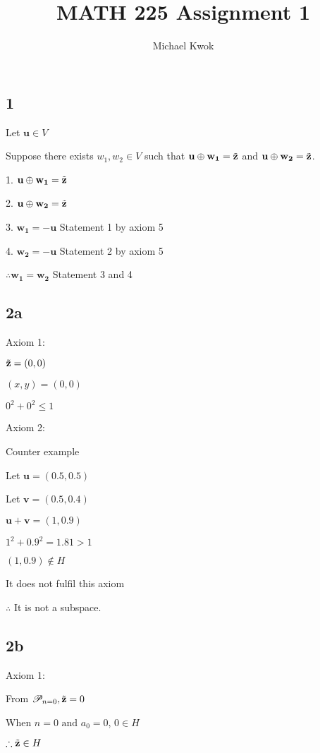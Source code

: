 \documentclass{article}
\title{MATH 225 Assignment 1}
\author{Michael Kwok}
\begin{document}
\maketitle
\subsection*{1}
Let $\mathbf{u} \in V$

Suppose there exists $w_1, w_2 \in V$ such that $\mathbf{u} \oplus \mathbf{w_1} = \Tilde{\mathbf{z}}$ and $\mathbf{u} \oplus \mathbf{w_2} = \Tilde{\mathbf{z}}$.

1. $\mathbf{u}\oplus \mathbf{w_1} = \Tilde{\mathbf{z}}$

2. $\mathbf{u}\oplus \mathbf{w_2} = \Tilde{\mathbf{z}}$

3. $\mathbf{w_1} = - \mathbf{u}$ Statement 1 by axiom 5

4. $\mathbf{w_2} = - \mathbf{u}$ Statement 2 by axiom 5

$\therefore \mathbf{w_1} = \mathbf{w_2}$ Statement 3 and 4
\newpage
\subsection*{2a}
Axiom 1:

$\Tilde{\mathbf{z}} = (0, 0)$

$(x, y) = (0, 0)$

$0^2 + 0^2 \leq 1$

\noindent
Axiom 2:

Counter example

Let $\mathbf{u} = \left(0.5, 0.5\right)$

Let $\mathbf{v} = \left(0.5, 0.4\right)$

$\mathbf{u} + \mathbf{v} = (1, 0.9)$

$1^2 + 0.9^2 = 1.81 > 1$

$(1, 0.9) \not\in H$

It does not fulfil this axiom


$\therefore$ It is not a subspace.

\subsection*{2b}
Axiom 1:

From $\mathscr{P}_{n=0}, \Tilde{\mathbf{z}} = 0$

When $n = 0 \text{ and } a_0 = 0$, $0 \in H$

$\therefore \Tilde{\mathbf{z}} \in H$
\end{document}
